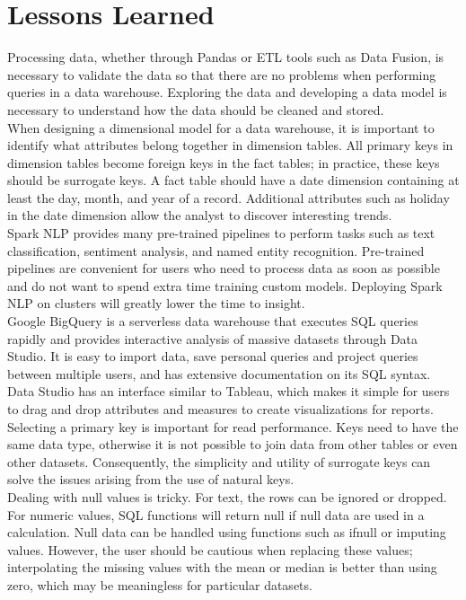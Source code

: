 \documentclass[11pt,journal,compsoc]{IEEEtran}
\begin{document}
\section{Lessons Learned}
Processing data, whether through Pandas or ETL tools such as Data Fusion, is necessary to validate the data so that there are no problems when performing queries in a data warehouse. Exploring the data and developing a data model is necessary to understand how the data should be cleaned and stored. \\
\indent When designing a dimensional model for a data warehouse, it is important to identify what attributes belong together in dimension tables. All primary keys in dimension tables become foreign keys in the fact tables; in practice, these keys should be surrogate keys. A fact table should have a date dimension containing at least the day, month, and year of a record. Additional attributes such as holiday in the date dimension allow the analyst to discover interesting trends. \\
\indent Spark NLP provides many pre-trained pipelines to perform tasks such as text classification, sentiment analysis, and named entity recognition. Pre-trained pipelines are convenient for users who need to process data as soon as possible and do not want to spend extra time training custom models. Deploying Spark NLP on clusters will greatly lower the time to insight. \\
\indent Google BigQuery is a serverless data warehouse that executes SQL queries rapidly and provides interactive analysis of massive datasets through Data Studio. It is easy to import data, save personal queries and project queries between multiple users, and has extensive documentation on its SQL syntax. Data Studio has an interface similar to Tableau, which makes it simple for users to drag and drop attributes and measures to create visualizations for reports. \\
\indent Selecting a primary key is important for read performance. Keys need to have the same data type, otherwise it is not possible to join data from other tables or even other datasets. Consequently, the simplicity and utility of surrogate keys can solve the issues arising from the use of natural keys. \\
\indent Dealing with null values is tricky. For text, the rows can be ignored or dropped. For numeric values, SQL functions will return null if null data are used in a calculation. Null data can be handled using functions such as ifnull or imputing values. However, the user should be cautious when replacing these values; interpolating the missing values with the mean or median is better than using zero, which may be meaningless for particular datasets.
\end{document}
